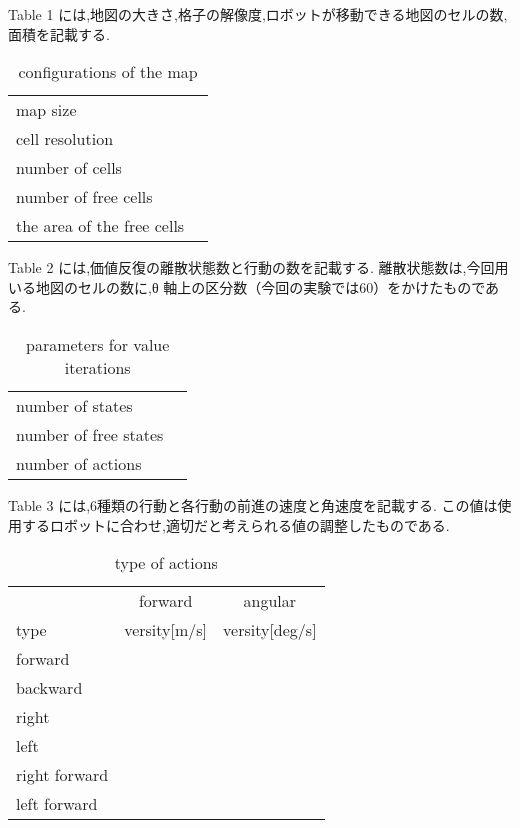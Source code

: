 \documentclass{jarticle}
\begin{document}

Table 1 には,地図の大きさ,格子の解像度,ロボットが移動できる地図のセルの数,面積を記載する.

\begin{table}[hbtp]
  \caption{conﬁgurations of the map}
  \centering
  \begin{tabular}{l|r}
    \hline
    map size & \\
    cell resolution &  \\
		number of cells & \\
    number of free cells & \\
		the area of the free cells & \\
    \hline
  \end{tabular}
\end{table}

Table 2 には,価値反復の離散状態数と行動の数を記載する.
離散状態数は,今回用いる地図のセルの数に,θ 軸上の区分数（今回の実験では60）をかけたものである.

\begin{table}[hbtp]
  \caption{parameters for value iterations}
  \centering
  \begin{tabular}{l|r}
    \hline
    number of states & \\
    number of free states &  \\
		number of actions & \\
    \hline
  \end{tabular}
\end{table}

Table 3 には,6種類の行動と各行動の前進の速度と角速度を記載する.
この値は使用するロボットに合わせ,適切だと考えられる値の調整したものである.

\begin{table}[hbtp]
	\caption{type of actions}
	\centering
	 \begin{tabular}{l|cc}
		\hline
		 & forward & angular \\
		type & versity[m/s] & versity[deg/s] \\
		\hline \hline
		forward &  &  \\
		backward &  &  \\
		right &  &  \\
		left &  &  \\
		right forward &  &  \\
		left forward &  & \\
		\hline
	 \end{tabular}
 \end{table}
\end{document}
